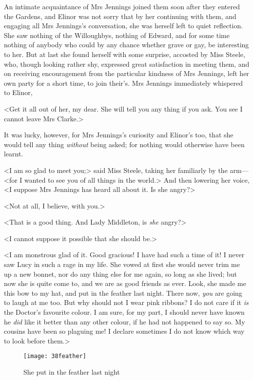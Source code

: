 An intimate acquaintance of Mrs Jennings joined them soon after they entered the Gardens, and Elinor was not sorry that by her continuing with them, and engaging all Mrs Jennings's conversation, she was herself left to quiet reflection. She saw nothing of the Willoughbys, nothing of Edward, and for some time nothing of anybody who could by any chance whether grave or gay, be interesting to her. But at last she found herself with some surprise, accosted by Miss Steele, who, though looking rather shy, expressed great satisfaction in meeting them, and on receiving encouragement from the particular kindness of Mrs Jennings, left her own party for a short time, to join their's. Mrs Jennings immediately whispered to Elinor,

<Get it all out of her, my dear. She will tell you any thing if you ask. You see I cannot leave Mrs Clarke.>

It was lucky, however, for Mrs Jennings's curiosity and Elinor's too, that she would tell any thing \textit{without} being asked; for nothing would otherwise have been learnt.

<I am so glad to meet you;> said Miss Steele, taking her familiarly by the arm—<for I wanted to see you of all things in the world.> And then lowering her voice, <I suppose Mrs Jennings has heard all about it. Is she angry?>

<Not at all, I believe, with you.>

<That is a good thing. And Lady Middleton, is \textit{she} angry?>

<I cannot suppose it possible that she should be.>

<I am monstrous glad of it. Good gracious! I have had such a time of it! I never saw Lucy in such a rage in my life. She vowed at first she would never trim me up a new bonnet, nor do any thing else for me again, so long as she lived; but now she is quite come to, and we are as good friends as ever. Look, she made me this bow to my hat, and put in the feather last night. There now, \textit{you} are going to laugh at me too. But why should not I wear pink ribbons? I do not care if it \textit{is} the Doctor's favourite colour. I am sure, for my part, I should never have known he \textit{did} like it better than any other colour, if he had not happened to say so. My cousins have been so plaguing me! I declare sometimes I do not know which way to look before them.>


\begin{a4}
	\begin{figure}[tbph]
		\centering
		\texttt{[image: 38feather]}
		\caption{She put in the feather last night}
	\end{figure}
\end{a4}

